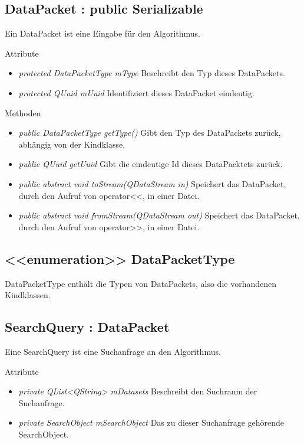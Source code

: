 \subsection*{DataPacket : public Serializable}
Ein DataPacket ist eine Eingabe für den Algorithmus.

Attribute
\begin{itemize}
\item\textit{protected DataPacketType mType} Beschreibt den Typ dieses DataPackets.
\item\textit{protected QUuid mUuid} Identifiziert dieses DataPacket eindeutig. 
\end{itemize}

Methoden
\begin{itemize}
\item \textit{public DataPacketType getType()} Gibt den Typ des DataPackets zurück, abhängig von der Kindklasse.
\item\textit{public QUuid getUuid} Gibt die eindeutige Id dieses DataPacktets zurück.
\item \textit{public abstract void toStream(QDataStream in)} Speichert das DataPacket, durch den Aufruf von operator<<, in einer Datei.
\item \textit{public abstract void fromStream(QDataStream out)} Speichert das DataPacket, durch den Aufruf von operator>>, in einer Datei.
\end{itemize}

\subsection*{<<enumeration>> DataPacketType}
DataPacketType enthält die Typen von DataPackets, also die vorhandenen Kindklassen.

\subsection*{SearchQuery : DataPacket}
Eine SearchQuery ist eine Suchanfrage an den Algorithmus.

Attribute
\begin{itemize}
\item\textit{private QList<QString> mDatasets} Beschreibt den Suchraum der Suchanfrage.
\item\textit{private SearchObject mSearchObject} Das zu dieser Suchanfrage gehörende SearchObject.
\end{itemize}

